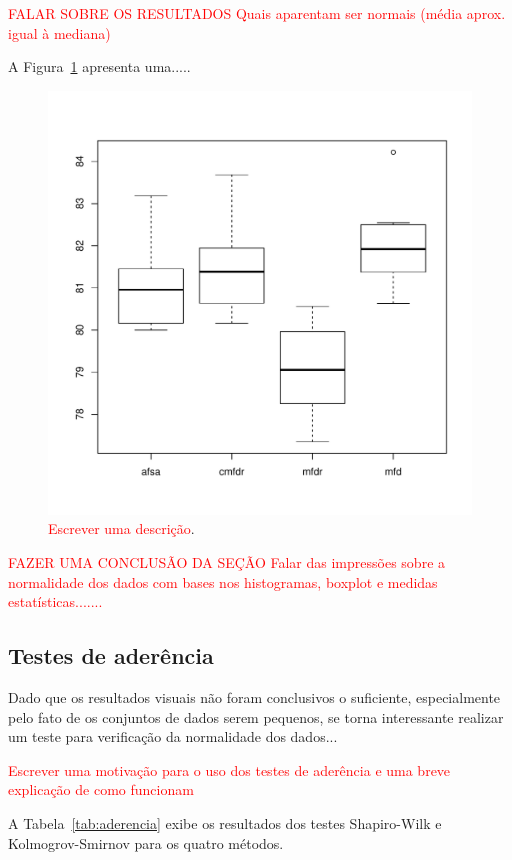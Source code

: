 \documentclass[conference]{IEEEtran}
\begin{document}
\textcolor{red}{FALAR SOBRE OS RESULTADOS
Quais aparentam ser normais (média aprox. igual à mediana)
}


A Figura~\ref{fig:boxplot} apresenta uma.....

\begin{figure}[h]
	\centering
	\includegraphics[width=\linewidth]{img/boxplot.pdf}
	\caption{\textcolor{red}{Escrever uma descrição}.}
	\label{fig:boxplot}
\end{figure}



\textcolor{red}{FAZER UMA CONCLUSÃO DA SEÇÃO
Falar das impressões sobre a normalidade dos dados com bases nos histogramas, boxplot e medidas estatísticas.......}

\subsection{Testes de aderência}
Dado que os resultados visuais não foram conclusivos o suficiente, especialmente pelo fato de os conjuntos de dados serem pequenos, se torna interessante realizar um teste para verificação da normalidade dos dados...

\textcolor{red}{Escrever uma motivação para o uso dos testes de aderência e uma breve explicação de como funcionam}

A Tabela~\ref{tab:aderencia} exibe os resultados dos testes Shapiro-Wilk e Kolmogrov-Smirnov para os quatro métodos.
\end{document}
